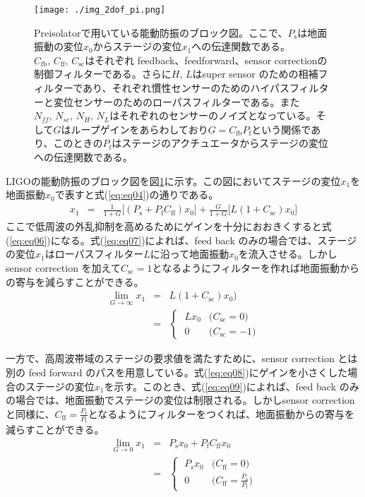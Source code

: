 \documentclass[a4paper,12pt]{jsarticle}
\begin{document}
\begin{figure}[H]
  \begin{center}
    \texttt{[image: ./img\_2dof\_pi.png]}
  \end{center}
  \caption{Preisolatorで用いている能動防振のブロック図。ここで、$P_{\mathrm{s}}$は地面振動の変位$x_0$からステージの変位$x_1$への伝達関数である。$C_{\mathrm{fb}},\,C_{\mathrm{ff}},\,C_{\mathrm{sc}}$はそれぞれ feedback、feedforward、sensor correctionの制御フィルターである。さらに$H,\,L$はsuper sensor のための相補フィルターであり、それぞれ慣性センサーのためのハイパスフィルターと変位センサーのためのローパスフィルターである。また$N_{ff},\,N_{sc},\,N_{H},\,N_{L}$はそれぞれのセンサーのノイズとなっている。そして$G$はループゲインをあらわしており$G=C_{\mathrm{fb}}P_{\mathrm{f}}$という関係であり、このときの$P_{\mathrm{f}}$はステージのアクチュエータからステージの変位への伝達関数である。}\label{img:img_2dof_pi}
\end{figure}


LIGOの能動防振のブロック図を図\ref{img:img_2dof_pi}に示す。この図においてステージの変位$x_1$を地面振動$x_0$で表すと式(\ref{eq:eq04})の通りである。
\begin{eqnarray} \label{eq:eq04}
  x_1 &=& \frac{1}{1+G}\Biggl[(P_{\mathrm{s}}+P_{\mathrm{f}}C_{\mathrm{ff}})x_0\Biggl]
  + \frac{G}{1+G}\Biggl[L(1+C_{\mathrm{sc}})x_0\Biggl]
\end{eqnarray}
ここで低周波の外乱抑制を高めるためにゲインを十分におおきくすると式(\ref{eq:eq06})になる。式(\ref{eq:eq07})によれば、feed back のみの場合では、ステージの変位$x_1$はローパスフィルター$L$に沿って地面振動$x_0$を流入させる。しかしsensor correction を加えて$C_{\mathrm{sc}}=1$となるようにフィルターを作れば地面振動からの寄与を減らすことができる。
\begin{eqnarray}\label{eq:eq06}
  \lim_{G \to \infty} x_{1} &=& L(1+C_{\mathrm{sc}})x_0) \\
  &=&
  \begin{cases}\label{eq:eq07}
    \; Lx_{0} & \text{($C_{\mathrm{sc}}=0$)}\\
    \; 0 & \text{($C_{\mathrm{sc}}=-1$)} 
  \end{cases}  
\end{eqnarray}

一方で、高周波帯域のステージの要求値を満たすために、sensor correction とは別の feed forward のパスを用意している。式(\ref{eq:eq08})にゲインを小さくした場合のステージの変位$x_1$を示す。このとき、式(\ref{eq:eq09})によれば、feed back のみの場合では、地面振動でステージの変位は制限される。しかしsensor correction と同様に、$C_{\mathrm{ff}}=\frac{P_{\mathrm{s}}}{P_{\mathrm{f}}}$となるようにフィルターをつくれば、地面振動からの寄与を減らすことができる。
\begin{eqnarray}\label{eq:eq08}
  \lim_{G \to 0} x_{1} &=& P_{\mathrm{s}}x_0 + P_{\mathrm{f}}C_{\mathrm{ff}}x_0 \\
  &=& 
  \begin{cases}\label{eq:eq09}
    \; P_{\mathrm{s}}x_{0} & \text{($C_{\mathrm{ff}}=0$)}\\
    \; 0 & \text{($C_{\mathrm{ff}}=\frac{P_{\mathrm{s}}}{P_{\mathrm{f}}}$)} 
  \end{cases}  
\end{eqnarray}
\end{document}
